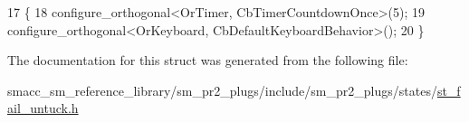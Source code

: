 \begin{DoxyCode}
17     \{
18         configure\_orthogonal<OrTimer,  CbTimerCountdownOnce>(5);    
19         configure\_orthogonal<OrKeyboard, CbDefaultKeyboardBehavior>();
20     \}
\end{DoxyCode}


The documentation for this struct was generated from the following file\+:\begin{DoxyCompactItemize}
\item 
smacc\+\_\+sm\+\_\+reference\+\_\+library/sm\+\_\+pr2\+\_\+plugs/include/sm\+\_\+pr2\+\_\+plugs/states/\hyperlink{st__fail__untuck_8h}{st\+\_\+fail\+\_\+untuck.\+h}\end{DoxyCompactItemize}
